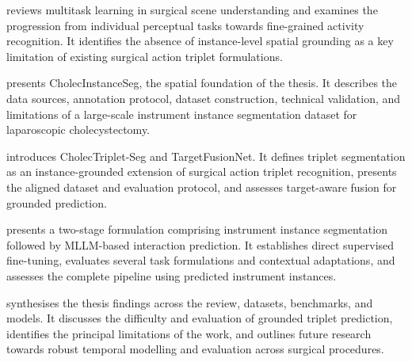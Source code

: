  reviews multitask learning in surgical scene understanding and examines the progression from individual perceptual tasks towards fine-grained activity recognition. It identifies the absence of instance-level spatial grounding as a key limitation of existing surgical action triplet formulations.

 presents CholecInstanceSeg, the spatial foundation of the thesis. It describes the data sources, annotation protocol, dataset construction, technical validation, and limitations of a large-scale instrument instance segmentation dataset for laparoscopic cholecystectomy.

 introduces CholecTriplet-Seg and TargetFusionNet. It defines triplet segmentation as an instance-grounded extension of surgical action triplet recognition, presents the aligned dataset and evaluation protocol, and assesses target-aware fusion for grounded prediction.

 presents a two-stage formulation comprising instrument instance segmentation followed by MLLM-based interaction prediction. It establishes direct supervised fine-tuning, evaluates several task formulations and contextual adaptations, and assesses the complete pipeline using predicted instrument instances.

 synthesises the thesis findings across the review, datasets, benchmarks, and models. It discusses the difficulty and evaluation of grounded triplet prediction, identifies the principal limitations of the work, and outlines future research towards robust temporal modelling and evaluation across surgical procedures.
